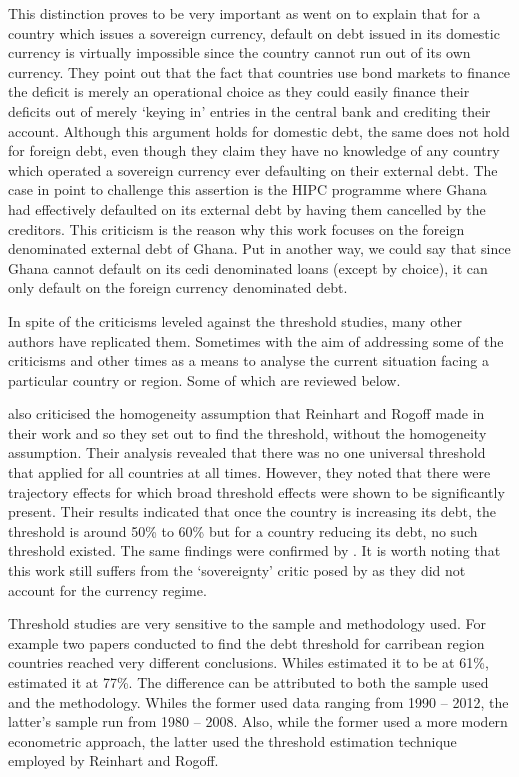 \documentclass[12pt, a4paper]{article}
\begin{document}
	This distinction proves to be very important as  went on to explain that for a country which issues a sovereign currency, default on debt issued in its domestic currency is virtually impossible since the country cannot run out of its own currency. They point out that the fact that countries use bond markets to finance the deficit is merely an operational choice as they could easily finance their deficits out of merely `keying in' entries in the central bank and crediting their account. Although this argument holds for domestic debt, the same does not hold for foreign debt, even though they claim they have no knowledge of any country which operated a sovereign currency ever defaulting on their external debt. The case in point to challenge this assertion is the HIPC programme where Ghana had effectively defaulted on its external debt by having them cancelled by the creditors. This criticism is the reason why this work focuses on the foreign denominated external debt of Ghana. Put in another way, we could say that since Ghana cannot default on its cedi denominated loans (except by choice), it can only default on the foreign currency denominated debt.
	
	In spite of the criticisms leveled against the threshold studies, many other authors have replicated them. Sometimes with the aim of addressing some of the criticisms and other times as a means to analyse the current situation facing a particular country or region. Some of which are reviewed below. 
	
	 also criticised the homogeneity assumption that Reinhart and Rogoff made in their work and so they set out to find the threshold, without the homogeneity assumption. Their analysis revealed that there was no one universal threshold that applied for all countries at all times. However, they noted that there were trajectory effects for which broad threshold effects were shown to be significantly present. Their results indicated that once the country is increasing its debt, the threshold is around 50\% to 60\% but for a country reducing its debt, no such threshold existed. The same findings were confirmed by . It is worth noting that this work still suffers from the `sovereignty' critic posed by   as they did not account for the currency regime.
	
	Threshold studies are very sensitive to the sample and methodology used. For example two papers conducted to find the debt threshold for carribean region countries reached very different conclusions. Whiles  estimated it to be at 61\%,  estimated it at 77\%. The difference can be attributed to both the sample used and the methodology. Whiles the former used data ranging from 1990 -- 2012, the latter's sample run from 1980 -- 2008. Also, while the former used a more modern econometric approach, the latter used the threshold estimation technique employed by Reinhart and Rogoff.
	
\end{document}

